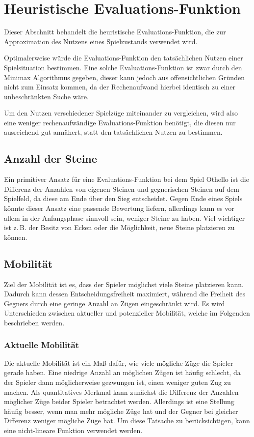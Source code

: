 \section{Heuristische Evaluations-Funktion}
\label{sec:heuristic}
Dieser Abschnitt behandelt die heuristische Evaluations-Funktion, die zur Approximation des Nutzens eines Spielzustands
verwendet wird.

Optimalerweise würde die Evaluations-Funktion den tatsächlichen Nutzen einer Spielsituation bestimmen. Eine solche
Evaluations-Funktion ist zwar durch den Minimax Algorithmus gegeben, dieser kann jedoch aus offensichtlichen Gründen
nicht zum Einsatz kommen, da der Rechenaufwand hierbei identisch zu einer unbeschränkten Suche wäre.

Um den Nutzen verschiedener Spielzüge miteinander zu vergleichen, wird also eine weniger rechenaufwändige
Evaluations-Funktion benötigt, die diesen nur ausreichend gut annähert, statt den tatsächlichen Nutzen zu bestimmen.

\subsection{Anzahl der Steine}
\label{sec:disccount}
Ein primitiver Ansatz für eine Evaluations-Funktion bei dem Spiel Othello ist die Differenz der Anzahlen von eigenen
Steinen und gegnerischen Steinen auf dem Spielfeld, da diese am Ende über den Sieg entscheidet. Gegen Ende eines Spiels
könnte dieser Ansatz eine passende Bewertung liefern, allerdings kann es vor allem in der Anfangsphase sinnvoll sein,
weniger Steine zu haben. Viel wichtiger ist z.\,B. der Besitz von Ecken oder die Möglichkeit, neue Steine platzieren zu können.

\subsection{Mobilität}
\label{sec:mobility}
Ziel der Mobilität ist es, dass der Spieler möglichst viele Steine platzieren kann. Dadurch kann dessen
Entscheidungsfreiheit maximiert, während die Freiheit des Gegners durch eine geringe Anzahl an Zügen eingeschränkt wird.
Es wird Unterschieden zwischen aktueller und potenzieller Mobilität, welche im Folgenden beschrieben werden.
\cite[S.~7f.]{evaluationfunctions}

\subsubsection{Aktuelle Mobilität}
\label{sec:theorycurrentmobility}
Die aktuelle Mobilität ist ein Maß dafür, wie viele mögliche Züge die Spieler gerade haben. Eine niedrige Anzahl an
möglichen Zügen ist häufig schlecht, da der Spieler dann möglicherweise gezwungen ist, einen weniger guten Zug zu machen. Als quantitatives
Merkmal kann zunächst die Differenz der Anzahlen möglicher Züge beider Spieler betrachtet werden. Allerdings ist eine Stellung
häufig besser, wenn man mehr mögliche Züge hat und der Gegner bei gleicher Differenz weniger mögliche Züge hat. Um diese
Tatsache zu berücksichtigen, kann eine nicht-lineare Funktion verwendet werden.
\cite[S.~7]{evaluationfunctions}

